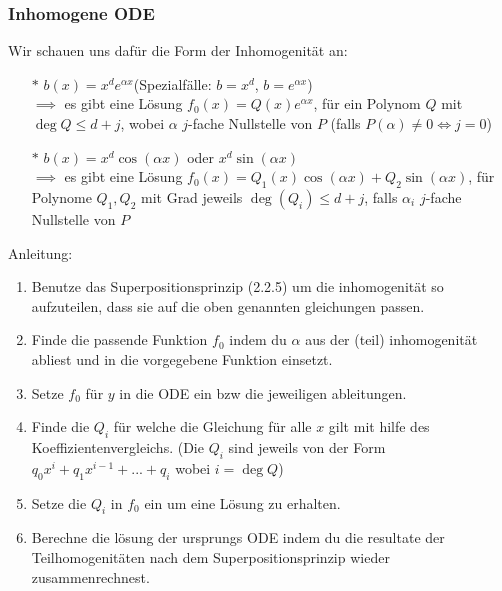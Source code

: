   \subsubsection{Inhomogene ODE}
    Wir schauen uns dafür die Form der Inhomogenität an:
    \begin{enumerate}
      \item[$*$] $b(x)=x^de^{\alpha x}$\hfill (Spezialfälle: $b=x^d$, 
        $b=e^{\alpha x}$)\\
        $\implies$ es gibt eine Lösung $f_0(x)=Q(x)e^{\alpha x}$, für ein
        Polynom $Q$ mit $\deg Q\leq d+j$, wobei $\alpha$ $j$-fache Nullstelle von
        $P$ (falls $P(\alpha)\neq0 \iff j=0$)
      \item[$*$] $b(x)=x^d\cos(\alpha x)$ oder $x^d\sin(\alpha x)$\\
        $\implies$ es gibt eine Lösung $f_0(x)=Q_1(x)\cos(\alpha
        x)+Q_2\sin(\alpha x)$, für Polynome $Q_1,Q_2$ mit Grad jeweils
        $\deg(Q_i) \leq d+j$, falls $\alpha_i$ $j$-fache Nullstelle von $P$
    \end{enumerate}
    Anleitung:
    \begin{enumerate}
      \item Benutze das Superpositionsprinzip (2.2.5) um die inhomogenität so 
        aufzuteilen, dass sie auf die oben genannten gleichungen passen.
      \item Finde die passende Funktion $f_0$ indem du $\alpha$ aus der (teil) inhomogenität
        abliest und in die vorgegebene Funktion einsetzt.
      \item Setze $f_0$ für $y$ in die ODE ein bzw die jeweiligen ableitungen.
      \item Finde die $Q_i$ für welche die Gleichung für alle $x$ gilt mit hilfe
        des Koeffizientenvergleichs.
            (Die $Q_i$ sind jeweils von der Form
        $q_0x^{i}+q_1x^{i-1}+...+q_i$ wobei $i=\deg Q$)
      \item Setze die $Q_i$ in $f_0$ ein um eine Lösung zu erhalten.
      \item Berechne die lösung der ursprungs ODE indem du die resultate der
        Teilhomogenitäten nach dem Superpositionsprinzip wieder
        zusammenrechnest.
    \end{enumerate}

